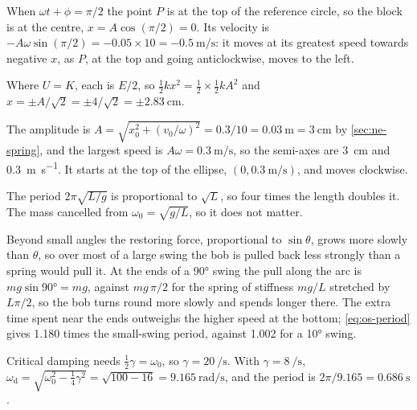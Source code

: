 \label{sec:os-answers}

When $\omega t + \phi = \pi/2$ the point $P$ is at the top
of the reference circle, so the block is at the centre, $x = A\cos(\pi/2)
= 0$. Its velocity is $-A\omega\sin(\pi/2) = -0.05\times10 =
\SI{-0.5}{\metre\per\second}$: it moves at its greatest speed towards
negative $x$, as $P$, at the top and going anticlockwise, moves to the
left.

Where $U = K$, each is $E/2$, so $\frac12 kx^2 =
\frac12\times\frac12 kA^2$ and $x = \pm A/\sqrt2 = \pm4/\sqrt2 =
\pm\SI{2.83}{\centi\metre}$.

The amplitude is $A = \sqrt{x_0^2 + (v_0/\omega)^2}
= 0.3/10 = \SI{0.03}{\metre} = \SI{3}{\centi\metre}$ by \cref{sec:ne-spring}, and the largest
speed is $A\omega = \SI{0.3}{\metre\per\second}$, so the semi-axes are
\SI{3}{\centi\metre} and \SI{0.3}{\metre\per\second}. It starts at the top
of the ellipse, $(0, \SI{0.3}{\metre\per\second})$, and moves clockwise.

The period $2\pi\sqrt{L/g}$ is proportional to
$\sqrt L$, so four times the length doubles it. The mass cancelled from
$\omega_0 = \sqrt{g/L}$, so it does not matter.

Beyond small angles the restoring force,
proportional to $\sin\theta$, grows more slowly than $\theta$, so over most
of a large swing the bob is pulled back less strongly than a spring would
pull it. At the ends of a \ang{90} swing the pull along the arc is
$mg\sin\ang{90} = mg$, against $mg\,\pi/2$ for the spring of stiffness
$mg/L$ stretched by $L\pi/2$, so the bob turns round more slowly and
spends longer there. The extra time spent near the ends outweighs the
higher speed at the bottom; \cref{eq:os-period} gives 1.180 times the
small-swing period, against 1.002 for a \ang{10} swing.

Critical damping needs $\frac12\gamma = \omega_0$,
so $\gamma = \SI{20}{\per\second}$. With $\gamma = \SI{8}{\per\second}$,
$\omega_{\mathrm d} = \sqrt{\omega_0^2 - \frac14\gamma^2} = \sqrt{100 -
16} = \SI{9.165}{\radian\per\second}$,
and the period is $2\pi/9.165 = \SI{0.686}{\second}$.

